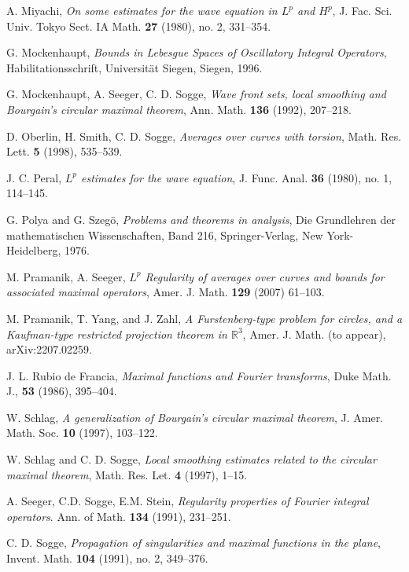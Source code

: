 \documentclass[10pt] %
{amsart}
\theoremstyle{plain}
\numberwithin{equation}{section}
\begin{document}
\begin{thebibliography}{}
 A. Miyachi, \textit{On some estimates for the wave equation in $L^p$ and $H^p$}, J. Fac. Sci. Univ. Tokyo Sect.
IA Math. {\bf 27} (1980), no. 2, 331--354.
	
 G. Mockenhaupt, \textit{Bounds in Lebesgue Spaces of Oscillatory Integral Operators}, Habilitationsschrift, Universität Siegen, Siegen, 1996. 

 G. Mockenhaupt, A. Seeger, C. D. Sogge, \textit{Wave front sets, local smoothing and Bourgain’s
circular maximal theorem}, Ann. Math. {\bf 136} (1992), 207--218.

 D. Oberlin, H. Smith, C. D. Sogge, \textit{Averages over curves with torsion}, Math. Res. Lett. {\bf 5} (1998), 535--539.

 J. C. Peral, \textit{$L^p$ estimates for the wave equation}, J. Func. Anal. {\bf 36} (1980), no. 1, 114--145.
	
 G. Polya and  G. Szeg\"o,  \textit{Problems and theorems in analysis}, Die Grundlehren der mathematischen Wissenschaften, Band 216, Springer-Verlag, New York-Heidelberg, 1976.

 M. Pramanik, A. Seeger, \textit{$L^p$ Regularity of averages over curves and bounds for associated maximal operators}, Amer. J.
Math. \textbf{129} (2007) 61--103.

 M. Pramanik, T. Yang, and J. Zahl, \textit{A Furstenberg-type problem for circles, and a Kaufman-type restricted projection theorem in $\mathbb R^3$},
Amer. J. Math. (to appear), arXiv:2207.02259.



 J. L. Rubio de Francia, \textit{Maximal functions and Fourier transforms}, Duke Math. J., {\bf 53} (1986), 395--404.



 W. Schlag,  \textit{A generalization of Bourgain’s circular maximal theorem}, J. Amer. Math. Soc.  {\bf 10} (1997), 103--122.
	
 W. Schlag and C. D. Sogge,  \textit{Local smoothing estimates related to the circular maximal theorem}, Math. Res. Let. {\bf 4} (1997), 1--15.

  A. Seeger, C.D. Sogge, E.M. Stein, \textit{Regularity properties of Fourier integral operators}.
Ann. of Math.  {\bf 134} (1991), 231--251.

 C. D. Sogge, \textit{Propagation of singularities and maximal functions in the plane}, Invent. Math. \textbf{104} (1991), no. 2, 349--376.


\end{thebibliography}
\end{document}
